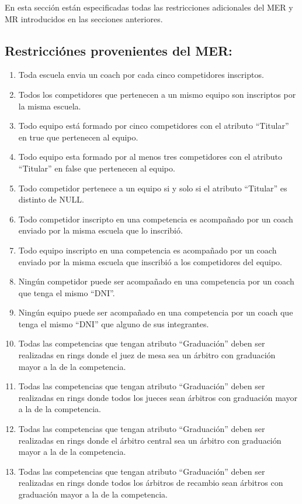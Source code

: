 En esta sección están especificadas todas las restricciones adicionales del MER y MR introducidos en las secciones anteriores.

\subsection{Restricciónes provenientes del MER:}
\begin{enumerate}
    \item Toda escuela envia un coach por cada cinco competidores inscriptos.
    \item Todos los competidores que pertenecen a un mismo equipo son inscriptos por la misma escuela.
    \item Todo equipo está formado por cinco competidores con el atributo ``Titular'' en true que pertenecen al equipo.
    \item Todo equipo esta formado por al menos tres competidores con el atributo ``Titular'' en false que pertenecen al equipo.
    \item Todo competidor pertenece a un equipo si y solo si el atributo ``Titular'' es distinto de NULL.
    \item Todo competidor inscripto en una competencia es acompañado por un coach enviado por la misma escuela que lo inscribió.
    \item Todo equipo inscripto en una competencia es acompañado por un coach enviado por la misma escuela que inscribió a los competidores del equipo.
    \item Ningún competidor puede ser acompañado en una competencia por un coach que tenga el mismo ``DNI''.
    \item Ningún equipo puede ser acompañado en una competencia por un coach que tenga el mismo ``DNI'' que alguno de sus integrantes.
    \item Todas las competencias que tengan atributo ``Graduación'' deben ser realizadas en rings donde el juez de mesa sea un árbitro con graduación mayor a la de la competencia.
    \item Todas las competencias que tengan atributo ``Graduación'' deben ser realizadas en rings donde todos los jueces sean árbitros con graduación mayor a la de la competencia.
    \item Todas las competencias que tengan atributo ``Graduación'' deben ser realizadas en rings donde el árbitro central sea un árbitro con graduación mayor a la de la competencia.
    \item Todas las competencias que tengan atributo ``Graduación'' deben ser realizadas en rings donde todos los árbitros de recambio sean árbitros con graduación mayor a la de la competencia.

\end{enumerate}
